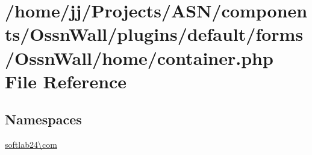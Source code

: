 \hypertarget{forms_2_ossn_wall_2home_2container_8php}{}\section{/home/jj/\+Projects/\+A\+S\+N/components/\+Ossn\+Wall/plugins/default/forms/\+Ossn\+Wall/home/container.php File Reference}
\label{forms_2_ossn_wall_2home_2container_8php}
\subsection*{Namespaces}
\begin{DoxyCompactItemize}
\item 
 \hyperlink{namespacesoftlab24_1_1com}{softlab24\textbackslash{}com}
\end{DoxyCompactItemize}
